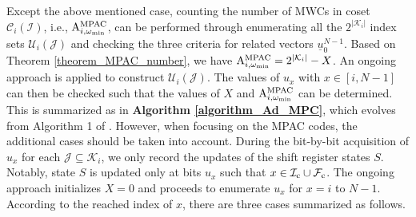 \documentclass[12pt, draftclsnofoot, peerreview, onecolumn]{IEEEtran}
\theoremstyle{noparent}
\begin{document}
Except the above mentioned case, counting the number of MWCs in coset $\mathcal{C}_i(\mathcal{I})$, 
i.e., ${\rm A}_{i,\omega_{\rm{min}}}^{\rm{MPAC}}$,
can be performed through enumerating all the $2^{|\mathcal{K}_{i}|}$ index sets $\mathcal{U}_i(\mathcal{J})$
and checking the three criteria for related vectors $\underline{u}_0^{N-1}$.
Based on Theorem \ref{theorem_MPAC_number},
we have ${\rm A}_{i,\omega_{\rm{min}}}^{\rm{MPAC}}=2^{|\mathcal{K}_i|} - X$.
An ongoing approach is applied to construct $\mathcal{U}_i(\mathcal{J})$. The values of $u_x$ with $x\in[i,N-1]$ can then be checked such that the values of $X$
and ${\rm A}_{i,\omega_{\rm{min}}}^{\rm{MPAC}}$ can be determined.
This is summarized as in {\bf Algorithm \ref{algorithm_Ad_MPC}},
which evolves from Algorithm 1 of \cite{Rowshan2022FastEnumerationMinimum}.
However, when focusing on the MPAC codes, 
the additional cases should be taken into account.
During the bit-by-bit acquisition of $u_x$ for each $\mathcal{J}\subseteq\mathcal{K}_i$, 
we only record the updates of the shift register states $S$.
Notably, state $S$ is updated only at bits $u_x$ such that
$x\in \mathcal{I}_{\rm c}\cup \mathcal{F}_{\rm c}$.
The ongoing approach initializes $X=0$ and proceeds to enumerate $u_x$ for $x=i$ to $N-1$. According to the reached index of $x$, there are three cases summarized as follows.
\end{document}
